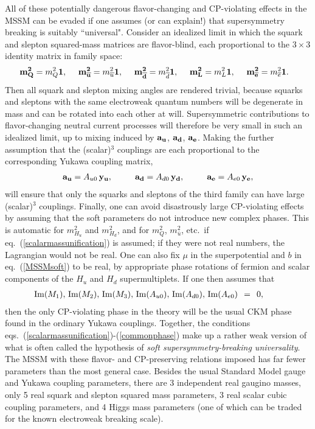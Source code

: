 \documentclass[12pt]{article}
\def\beq{\begin{eqnarray}}
\def\eeq{\end{eqnarray}}
\def\sbar{\overline}
\begin{document}
\vspace{0.6mm}

All of these potentially dangerous flavor-changing and CP-violating
effects in the MSSM can be evaded if one assumes (or can explain!) that
supersymmetry breaking is suitably ``universal". Consider an idealized
limit in which the squark and slepton squared-mass matrices are
flavor-blind, each proportional to the $3\times 3$ identity matrix in
family space: 
\beq
{\bf m^2_{Q}} = m^2_{Q} {\bf 1},
\qquad\!\!\!\!
{\bf m^2_{\sbar u}} = m^2_{\sbar u} {\bf 1},
\qquad\!\!\!\!
{\bf m^2_{\sbar d}} = m^2_{\sbar d} {\bf 1},
\qquad\!\!\!\!
{\bf m^2_{L}} = m^2_{L} {\bf 1},
\qquad\!\!\!\!
{\bf m^2_{\sbar e}} = m^2_{\sbar e} {\bf 1}
.\>\>\>\>{}
\label{scalarmassunification}
\eeq
Then all squark and slepton mixing angles are rendered trivial, because
squarks and sleptons with the same electroweak quantum numbers will be
degenerate in mass and can be rotated into each other at will.
Supersymmetric contributions to flavor-changing neutral current processes
will therefore be very small in such an idealized limit, up to mixing
induced by $\bf a_u$, $\bf a_d$, $\bf a_e$. Making the further assumption
that the (scalar)$^3$ couplings are each proportional to the corresponding
Yukawa coupling matrix,
\beq
{\bf a_u} = A_{u0} \,{\bf y_u}, \>\>\>\qquad
{\bf a_d} = A_{d0} \,{\bf y_d}, \>\>\>\qquad
{\bf a_e} = A_{e0} \,{\bf y_e},
\label{aunification}
\eeq
will ensure that only the squarks and sleptons of the third family can
have large (scalar)$^3$ couplings. Finally, one can avoid disastrously
large CP-violating effects by assuming that the soft parameters do not
introduce new complex phases. This is automatic for $m_{H_u}^2$ and
$m_{H_d}^2$, and for $m_Q^2$, $m_{\sbar u}^2$, etc.~if
eq.~(\ref{scalarmassunification}) is assumed; if they were not real
numbers, the Lagrangian would not be real. One can also fix $\mu$ in the
superpotential and $b$ in eq.~(\ref{MSSMsoft}) to be real, by appropriate
phase rotations of fermion and scalar components of the $H_u$ and $H_d$
supermultiplets. If one then assumes that
\beq
{\rm Im} (M_1),\, {\rm Im} (M_2),\, {\rm Im} (M_3),\,
{\rm Im} (A_{u0}),\, {\rm Im} (A_{d0}),\, {\rm Im} (A_{e0}) 
\>\> = \>\>
0,
\qquad{}
\label{commonphase}
\eeq
then the only CP-violating phase in the theory will be the usual CKM phase
found in the ordinary Yukawa couplings. Together, the conditions
eqs.~(\ref{scalarmassunification})-(\ref{commonphase}) make up a rather
weak version of what is often called the hypothesis of {\it soft
supersymmetry-breaking universality}. The MSSM with these flavor- and
CP-preserving relations imposed has far fewer parameters than the most
general case. Besides the usual Standard Model gauge and Yukawa coupling
parameters, there are 3 independent real gaugino masses, only 5 real
squark and slepton squared mass parameters, 3 real scalar cubic coupling
parameters, and 4 Higgs mass parameters (one of which can be traded for
the known electroweak breaking scale). 
\end{document}
